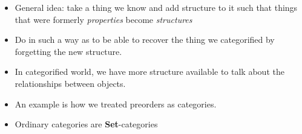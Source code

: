 \begin{itemize}
    \item General idea: take a thing we know and add structure to it such that things that were formerly \emph{properties} become \emph{structures}
    \item Do in such a way as to be able to recover the thing we categorified by forgetting the new structure.
    \item In categorified world, we have more structure available to talk about the relationships between objects.
    \item An example is how we treated preorders as categories.
    \item Ordinary categories are \textbf{Set}-categories
  \end{itemize}
